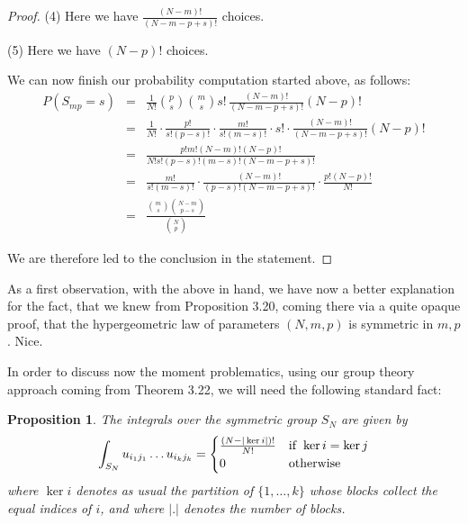 \documentclass[12pt]{amsbook}
\newtheorem{proposition}[theorem]{Proposition}
\begin{document}
\begin{proof}
\medskip

(4) Here we have $\frac{(N-m)!}{(N-m-p+s)!}$ choices.

\medskip

(5) Here we have $(N-p)!$ choices.

\medskip

We can now finish our probability computation started above, as follows:
\begin{eqnarray*}
P(S_{mp}=s)
&=&\frac{1}{N!}\binom{p}{s}\binom{m}{s}s!\,\frac{(N-m)!}{(N-m-p+s)!}(N-p)!\\
&=&\frac{1}{N!}\cdot\frac{p!}{s!(p-s)!}\cdot\frac{m!}{s!(m-s)!}\cdot s!\cdot\frac{(N-m)!}{(N-m-p+s)!}(N-p)!\\
&=&\frac{p!m!(N-m)!(N-p)!}{N!s!(p-s)!(m-s)!(N-m-p+s)!}\\
&=&\frac{m!}{s!(m-s)!}\cdot\frac{(N-m)!}{(p-s)!(N-m-p+s)!}\cdot\frac{p!(N-p)!}{N!}\\
&=&\frac{\binom{m}{s}\binom{N-m}{p-s}}{\binom{N}{p}}
\end{eqnarray*}

We are therefore led to the conclusion in the statement.
\end{proof}

As a first observation, with the above in hand, we have now a better explanation for the fact, that we knew from Proposition 3.20, coming there via a quite opaque proof, that the hypergeometric law of parameters $(N,m,p)$ is symmetric in $m,p$. Nice.
 
\bigskip

In order to discuss now the moment problematics, using our group theory approach coming from Theorem 3.22, we will need the following standard fact:

\begin{proposition}
The integrals over the symmetric group $S_N$ are given by
$$\int_{S_N}u_{i_1j_1}\ldots u_{i_kj_k}=\begin{cases}
\frac{(N-|\ker i|)!}{N!}&{\rm if}\ \ker i=\ker j\\
0&{\rm otherwise}
\end{cases}$$
where $\ker i$ denotes as usual the partition of $\{1,\ldots,k\}$ whose blocks collect the equal indices of $i$, and where $|.|$ denotes the number of blocks.
\end{proposition}
\end{document}
